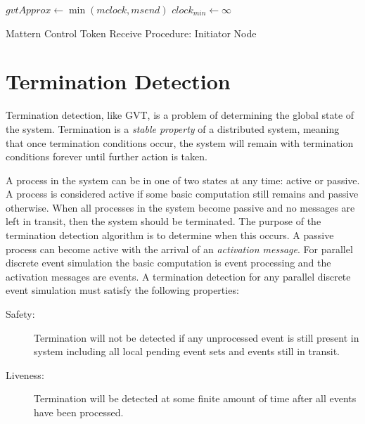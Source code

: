 \documentclass[11pt]{book}
\begin{document}
\begin{algorithm}
\DontPrintSemicolon
\SetAlgoVlined
{}
     {
        $gvtApprox \gets \min{(mclock, msend)}$\;
        \SendGVTUpdate{}\;
         
        $clock_{min} \gets \infty$\;
    } 
\caption{Mattern Control Token Receive Procedure: Initiator Node}\label{gvt_receive_init}
\end{algorithm}

\section{Termination Detection}

Termination detection, like GVT, is a problem of determining the global state of the system.
Termination is a \emph{stable property} of a distributed system, meaning that once termination
conditions occur, the system will remain with termination conditions forever until further
action is taken.

A process in the system can be in one of two states at any time: active or passive. A process
is considered active if some basic computation still remains and passive otherwise.
When all processes in the system become passive and no messages are left in transit, then
the system should be terminated. The purpose of the termination detection algorithm is to
determine when this occurs. A passive process can become active with the arrival of an
\emph{activation message}. For parallel discrete event simulation the basic computation is
event processing and the activation messages are events. A termination detection for any
parallel discrete event simulation must satisfy the following properties:

\begin{description}
    \item[Safety:] Termination will not be detected if any unprocessed event is still present
        in system including all local pending event sets and events still in transit.
    \item[Liveness:] Termination will be detected at some finite amount of time after all
        events have been processed.
\end{description}
\end{document}
